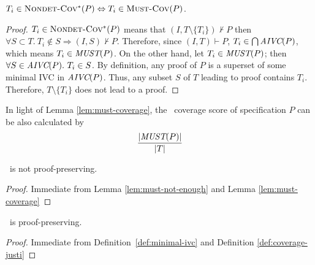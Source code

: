 \begin{lemma}
  \label{lem:must-coverage}
$T_i \in \text{\sc Nondet-Cov$^{*}$} (P) \Leftrightarrow T_i \in \text{\sc Must-Cov}(P)$.
\end{lemma}
\begin{proof}
$T_i \in \text{\sc Nondet-Cov$^{*}$} (P)$ means that $(I, T \setminus \{ T_i \}) \nvdash P$ then
$\forall S \subset T .~ T_i \notin S \Rightarrow (I, S) \nvdash P$.
Therefore, since $(I, T) \vdash P$, $T_i \in \bigcap \textit{AIVC}(P)$, which means  $T_i \in \textit{MUST}(P)$.
On the other hand, let $T_i \in \textit{MUST}(P)$; then $\forall S \in \textit{AIVC}(P).~ T_i \in S$.
By definition, any proof of $P$ is a superset of some minimal IVC in $\textit{AIVC}(P)$.
Thus, any subset $S$ of $T$ leading to proof contains $T_i$.
Therefore, $T \setminus \{ T_i \}$ does not lead to a proof.

\end{proof}
\vspace{2mm}

In light of Lemma \ref{lem:must-coverage}, the \nondetcovalt\ coverage score of specification $P$ can be also calculated by
$$\frac{|\textit{MUST}(P)|}{|T|}$$


%
\begin{corollary}
\label{cor:must-not-provable}
\nondetcovalt\ is not proof-preserving.
\end{corollary}
\begin{proof}
Immediate from Lemma \ref{lem:must-not-enough} and Lemma \ref{lem:must-coverage}
\end{proof}
\vspace{2mm}
\begin{corollary}
\label{cor:ivc-provable}
\ivccov\ is proof-preserving.
\end{corollary}
\begin{proof}
Immediate from Definition~\ref{def:minimal-ivc} and Definition \ref{def:coverage-justi}
\end{proof}
\vspace{2mm}

\fi 

